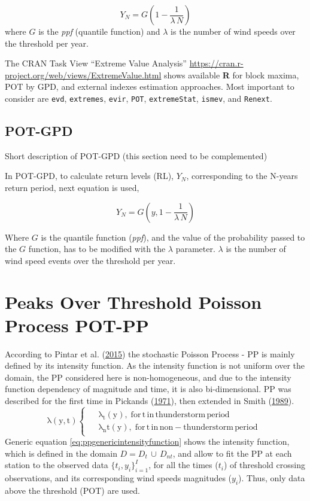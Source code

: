 \documentclass[12pt,oneside]{reedthesis}
\begin{document}
\[
Y_N = G\left(1-\frac{1}{\lambda\,N}\right)
\]
where \(G\) is the \emph{ppf} (quantile function) and \(\lambda\) is the number of wind speeds over the threshold per year.

The CRAN Task View ``Extreme Value Analysis'' \url{https://cran.r-project.org/web/views/ExtremeValue.html} shows available \textbf{R} for block maxima, POT by GPD, and external indexes estimation approaches. Most important to consider are \texttt{evd}, \texttt{extremes}, \texttt{evir}, \texttt{POT}, \texttt{extremeStat}, \texttt{ismev}, and \texttt{Renext}.

\hypertarget{pot-gpd}{%
\subsection{POT-GPD}\label{pot-gpd}}

Short description of POT-GPD (this section need to be complemented)

In POT-GPD, to calculate return levels (RL), \(Y_N\), corresponding to the N-years return period, next equation is used,

\[
Y_N =G\left(y, 1-\frac{1}{\lambda\,N}\right)
\]

Where \(G\) is the quantile function (\emph{ppf}), and the value of the probability passed to the \(G\) function, has to be modified with the \(\lambda\) parameter. \(\lambda\) is the number of wind speed events over the threshold per year.

\hypertarget{pot-pp}{%
\section{Peaks Over Threshold Poisson Process POT-PP}\label{pot-pp}}

According to Pintar et al. (\protect\hyperlink{ref-Pintar2015}{2015}) the stochastic Poisson Process - PP is mainly defined by its intensity function. As the intensity function is not uniform over the domain, the PP considered here is non-homogeneous, and due to the intensity function dependency of magnitude and time, it is also bi-dimensional. PP was described for the first time in Pickands (\protect\hyperlink{ref-Pickands1971}{1971}), then extended in Smith (\protect\hyperlink{ref-Smith1989}{1989}).
\begin{equation}
  \mathrm{
    \lambda\left(y,t\right)
    \begin{cases}
      \begin{split}
            &\lambda_t(y),\;for\,t\,in\,thunderstorm\,period
            \\
            &\lambda_nt(y),\;for\,t\,in\,non-thunderstorm\,period      
      \end{split}
    \end{cases}
  }
  \label{eq:ppgenericintensityfunction}
\end{equation}
Generic equation \eqref{eq:ppgenericintensityfunction} shows the intensity function, which is defined in the domain \(D = D_t\,{\cup}\,D_{nt}\), and allow to fit the PP at each station to the observed data \(\{t_i, y_i\}_{i=1}^I\), for all the times (\(t_i\)) of threshold crossing observations, and its corresponding wind speeds magnitudes (\(y_i\)). Thus, only data above the threshold (POT) are used.
\end{document}
